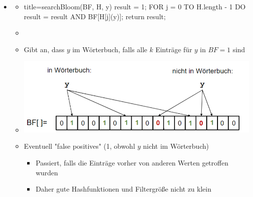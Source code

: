 \documentclass[
    12pt,
    a4paper,
    ngerman,
    color=3b,%
    marginpar=false,
    colorback=false,
    leqno,
]{tudaexercise}
\begin{document}
\begin{itemize}
        \item {}
            \begin{itemize}
                \item[]
                    \begin{ccode}[autogobble]{title={searchBloom(BF, H, y)}}
                    result = 1;
                    FOR j = 0 TO H.length - 1 DO
                        result = result AND BF[H[j](y)];
                    return result;
                    \end{ccode}
                \item[]
                \item Gibt an, dass $y$ im Wörterbuch, falls alle $k$ Einträge für $y$ in $BF=1$ sind
                \item[] \includegraphics[width=13.5cm]{pictures/bloomSearch.PNG}
                \item Eventuell \string"false positives\string" (1, obwohl $y$ nicht im Wörterbuch)
                    \begin{itemize}
                        \item Passiert, falls die Einträge vorher von anderen Werten getroffen wurden
                        \item Daher gute Hashfunktionen und Filtergrö\ss e nicht zu klein
                    \end{itemize}
            \end{itemize}
    \end{itemize}
    \clearpage
\end{document}
